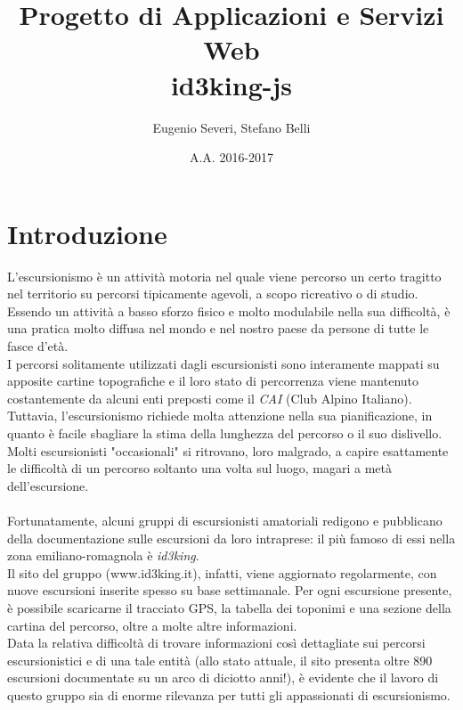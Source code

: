 \documentclass[11pt]{report}
\begin{document}
\title{Progetto di Applicazioni e Servizi Web\\id3king-js}
\author{Eugenio Severi, Stefano Belli}
\date{A.A. 2016-2017}
\begin{titlepage}
	\maketitle
\end{titlepage}

\setcounter{chapter}{1}
\section{Introduzione}
L'escursionismo è un attività motoria nel quale viene percorso un certo tragitto nel territorio su percorsi tipicamente agevoli, a scopo ricreativo o di studio.
\\Essendo un attività a basso sforzo fisico e molto modulabile nella sua difficoltà, è una pratica molto diffusa nel mondo e nel nostro paese da persone di tutte le fasce d'età.\\
I percorsi solitamente utilizzati dagli escursionisti sono interamente mappati su apposite cartine topografiche e il loro stato di percorrenza viene mantenuto costantemente da alcuni enti preposti come il \textit{CAI} (Club Alpino Italiano).
\\Tuttavia, l'escursionismo richiede molta attenzione nella sua pianificazione, in quanto è facile sbagliare la stima della lunghezza del percorso o il suo dislivello.
\\Molti escursionisti "occasionali" si ritrovano, loro malgrado, a capire esattamente le difficoltà di un percorso soltanto una volta sul luogo, magari a metà dell'escursione.
\\\\Fortunatamente, alcuni gruppi di escursionisti amatoriali redigono e pubblicano della documentazione sulle escursioni da loro intraprese: il più famoso di essi nella zona emiliano-romagnola è \textit{id3king}.
\\Il sito del gruppo (www.id3king.it), infatti, viene aggiornato regolarmente, con nuove escursioni inserite spesso su base settimanale.
Per ogni escursione presente, è possibile scaricarne il tracciato GPS, la tabella dei toponimi e una sezione della cartina del percorso, oltre a molte altre informazioni.
\\Data la relativa difficoltà di trovare informazioni così dettagliate sui percorsi escursionistici e di una tale entità (allo stato attuale, il sito presenta oltre 890 escursioni documentate su un arco di diciotto anni!), è evidente che il lavoro di questo gruppo sia di enorme rilevanza per tutti gli appassionati di escursionismo.
\end{document}
